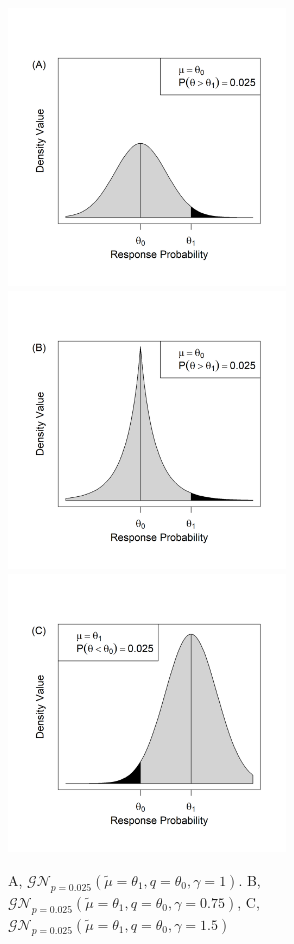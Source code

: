 \documentclass[useAMS,usenatbib]{biom}
\begin{document}
\begin{figure}
\begin{center}
\includegraphics[width=2.9in]{../00-paper/FIGURES/figure1a.png}
\includegraphics[width=2.9in]{../00-paper/FIGURES/figure1b.png}
\includegraphics[width=2.9in]{../00-paper/FIGURES/figure1c.png}
\caption{A, $\mathcal{GN}_{p=0.025}(\tilde{\mu}=\theta_1,q=\theta_0,\gamma=1)$. B, $\mathcal{GN}_{p=0.025}(\tilde{\mu}=\theta_1,q=\theta_0,\gamma=0.75)$, C, $\mathcal{GN}_{p=0.025}(\tilde{\mu}=\theta_1,q=\theta_0,\gamma=1.5)$}
\label{fig:figure1}
\end{center}
\end{figure}
\end{document}
